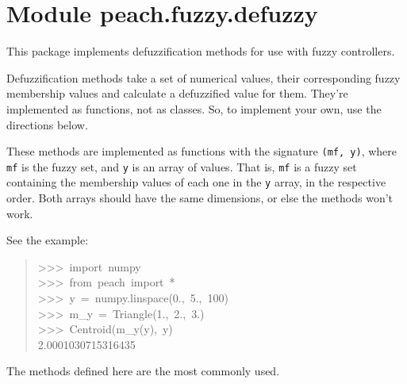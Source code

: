 %
%
%


\section{Module peach.fuzzy.defuzzy}

    \label{peach:fuzzy:defuzzy}

This package implements defuzzification methods for use with fuzzy controllers.

Defuzzification methods take a set of numerical values, their corresponding
fuzzy membership values and calculate a defuzzified value for them. They're
implemented as functions, not as classes. So, to implement your own, use the
directions below.

These methods are implemented as functions with the signature \texttt{(mf, y)}, where
\texttt{mf} is the fuzzy set, and \texttt{y} is an array of values. That is, \texttt{mf} is a
fuzzy set containing the membership values of each one in the \texttt{y} array, in
the respective order. Both arrays should have the same dimensions, or else the
methods won't work.

See the example:
%
\begin{quote}{\ttfamily \raggedright \noindent
>{}>{}>~import~numpy\\
>{}>{}>~from~peach~import~*\\
>{}>{}>~y~=~numpy.linspace(0.,~5.,~100)\\
>{}>{}>~m\_y~=~Triangle(1.,~2.,~3.)\\
>{}>{}>~Centroid(m\_y(y),~y)\\
2.0001030715316435
}
\end{quote}

The methods defined here are the most commonly used.


